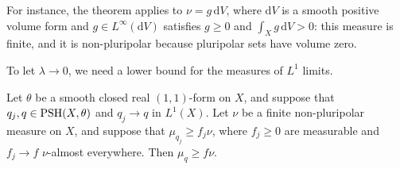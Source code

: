 For instance, the theorem applies to $\nu=g\,\mathrm dV$, where $\mathrm dV$ is a smooth positive volume form and $g\in L^\infty(\mathrm dV)$ satisfies $g\geq0$ and $\int_Xg\,\mathrm dV>0$: this measure is finite, and it is non-pluripolar because pluripolar sets have volume zero.

To let $\lambda\to0$, we need a lower bound for the measures of $L^1$ limits.

\begin{lemma}\label{lem:nonpluripolar-measure-lower-bound-lone-limit}
Let $\theta$ be a smooth closed real $(1,1)$-form on $X$, and suppose that $q_j,q\in\mathrm{PSH}(X,\theta)$ and $q_j\to q$ in $L^1(X)$. Let $\nu$ be a finite non-pluripolar measure on $X$, and suppose that $\mu_{q_j}\geq f_j\nu$, where $f_j\geq0$ are measurable and $f_j\to f$ $\nu$-almost everywhere. Then $\mu_q\geq f\nu$.
\end{lemma}
